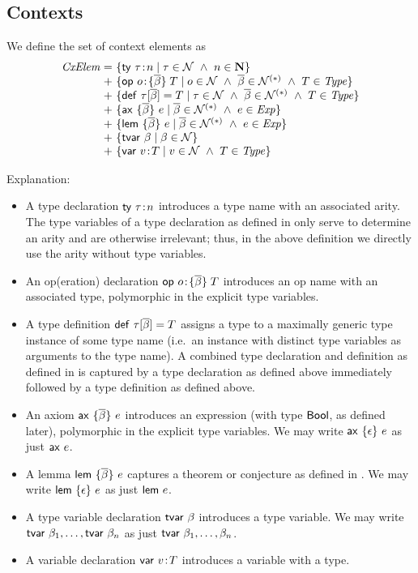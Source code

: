 \subsection{Contexts}

We define the set of context elements as
\[
\setdefVII
 {\Cxel}
 {+}
 {\setST{\tdecO}{\tnam\in\Nam\AND n\in\N}}
 {\setST{\odecO}{\onam\in\Nam\AND\tvarS\in\SeqNR{\Nam}\AND\typ\in\Typ}}
 {\setST{\tdefO}{\tnam\in\Nam\AND\tvarS\in\SeqNR{\Nam}\AND\typ\in\Typ}}
 {\setST{\axO}{\tvarS\in\SeqNR{\Nam}\AND\expr\in\Expr}}
 {\setST{\lemO}{\tvarS\in\SeqNR{\Nam}\AND\expr\in\Expr}}
 {\setST{\tvdecO}{\tvar\in\Nam}}
 {\setST{\vdecO}{\var\in\Nam\AND\typ\in\Typ}}
\]

Explanation:
\begin{itemize}
\item
A type declaration $\mathsf{ty}\ \tau\!:\!n$ introduces a type name with an associated arity.
The type variables of a type declaration as defined in \cite{lm} only serve to
determine an arity and are otherwise irrelevant; thus, in the above definition
we directly use the arity without type variables.
\item
An op(eration) declaration $\mathsf{op}\ o\!:\!\{\overline{\beta}\}\;T$ introduces an op name with an associated
type, polymorphic in the explicit type variables.
\item
A type definition $\mathsf{def}\ \tau[\overline{\beta}]=T$ assigns a type to a maximally generic type instance
of some type name (i.e.\ an instance with distinct type variables as arguments
to the type name). A combined type declaration and definition as defined in
\cite{lm} is captured by a type declaration as defined above immediately
followed by a type definition as defined above.
\item
An axiom $\mathsf{ax}\ \{\overline{\beta}\}\ e$ introduces an expression (with type $\mathsf{Bool}$, as defined
later), polymorphic in the explicit type variables. We may write
$\mathsf{ax}\ \{\epsilon\}\ e$ as just $\mathsf{ax}\ e$.
\item
A lemma $\mathsf{lem}\ \{\overline{\beta}\}\ e$ captures a theorem or conjecture as defined in \cite{lm}. We
may write $\mathsf{lem}\ \{\epsilon\}\ e$ as just $\mathsf{lem}\ e$.
\item
A type variable declaration $\mathsf{tvar}\ \beta$ introduces a type variable. We may write
$\mathsf{tvar}\ \beta_1,\ldots,\mathsf{tvar}\ \beta_n$ as just
$\mathsf{tvar}\ \beta_1,\ldots,\beta_n$.
\item
A variable declaration $\mathsf{var}\ v\!:\!T$ introduces a variable with a type.
\end{itemize}

